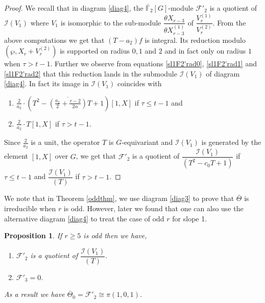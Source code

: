 \documentclass[11pt, reqno]{amsart}
\numberwithin{equation}{section}
\newcommand\sF{{\mathcal{F}}}
\newcommand{\F}{\mathbb{F}}
\newtheorem{prop}[thm]{Proposition}
\theoremstyle{definition}
\theoremstyle{remark}
\newtheorem{remark}[thm]{Remark}
\theoremstyle{definition}
\theoremstyle{remark}
\theoremstyle{remark}
\begin{document}
\begin{proof}
 We recall that in diagram \eqref{diag4}, the $\bar{\F}_{2}[G]$-module $\sF'_{2}$ is a quotient of $\mathcal{I}(V_{1})$ where $V_{1}$ is isomorphic to the sub-module $\dfrac{\theta X_{r-3}}{\theta X_{r-3}^{(1)}}$ of $\dfrac{V_{r}^{(1)}}{V_{r}^{(2)}}$. From the above computations we get that $(T-a_{2})f$ is integral. Its reduction modulo $(\wp, X_{r}+V_{r}^{(2)})$ is supported on radius $0,1$ and $2$ and in fact only on radius $1$ when $\tau>t-1$. Further we observe from equations    \eqref{sl1F2'rad0}, \eqref{sl1F2'rad1} and \eqref{sl1F2'rad2} that this reduction lands in the submodule $\mathcal{I}(V_{1})$ of diagram \eqref{diag4}. In fact its image in $\mathcal{I}(V_{1})$ coincides with 
 \begin{enumerate}
\item $\frac{2}{a_{2}}\cdot \left(T^2- \overline{\left(\frac{a_{2}}{2}+ \frac{r-2}{2\alpha}\right)}T + 1\right)\left[1, X\right]$ \enspace   if   $\tau\leq t-1$ and
\item $\frac{2}{a_{2}} \cdot T\left[1,X\right]$ \enspace  if  $\tau>t-1.$
\end{enumerate}
 Since $\frac{2}{a_{2}}$ is a unit, the operator $T$ is $G$-equivariant and $\mathcal{I}(V_{1})$ is generated by the element $[1,X]$ over $G$, we get that $\sF'_{2}$ is a quotient of $\dfrac{\mathcal{I}(V_{1})}{(T^2-c_{0}T+1)}$ if $\tau \leq t-1$ and $\dfrac{\mathcal{I}(V_{1})}{(T)}$ if $\tau>t-1$.
\end{proof}
 We note that in Theorem \ref{oddthm}, we use diagram \eqref{diag3} to prove that $\bar{\Theta}$ is irreducible when $r$ is odd. However, later we found that one can also use the alternative diagram \eqref{diag4}  to treat the case of odd $r$ for slope 1. 
\begin{prop} \label{bartheta0odd}
If $r\geq5$ is odd then we have,
\begin{enumerate}
\item $\mathcal{F}'_{2}$ is a quotient of $\dfrac{\mathcal{I}(V_{1})}{(T)}.$ \label{theta0odd1}
\item $\mathcal{F}'_{3}=0.$ \label{theta0odd2}
\end{enumerate}
As a result we have $\overline\Theta_0=\mathcal{F'}_{2}\cong \pi(1,0,{1})$. %
\end{prop}
\end{document}
